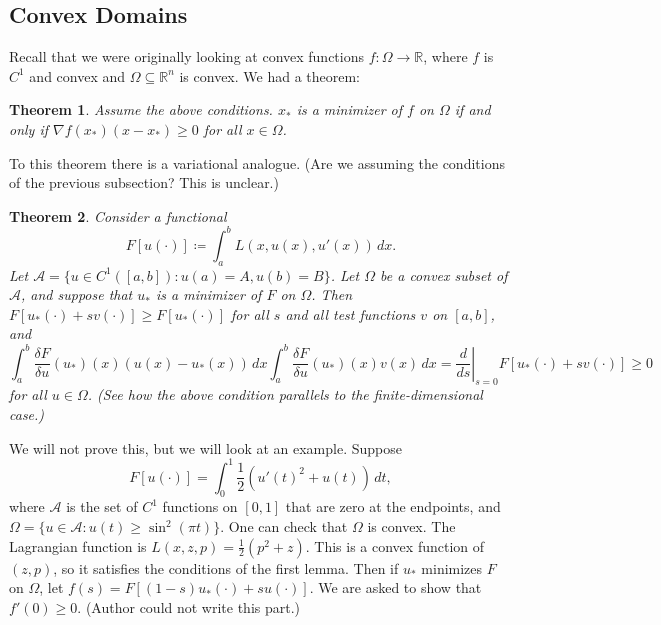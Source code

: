 \documentclass[11pt]{book}
\newcommand{\R}{\mathbb{R}}
\newtheorem{theorem}{Theorem}[subsection]
\begin{document}
\subsection{Convex Domains}

Recall that we were originally looking at convex functions $f : \Omega \to \R$, where $f$ is $C^1$ and convex and $\Omega \subseteq \R^n$ is convex. We had a theorem:
\begin{theorem}
Assume the above conditions. $x_*$ is a minimizer of $f$ on $\Omega$ if and only if $\nabla f(x_*)(x - x_*) \geq 0$ for all $x \in \Omega$.
\end{theorem}
To this theorem there is a variational analogue. (Are we assuming the conditions of the previous subsection? This is unclear.)
\begin{theorem}
Consider a functional
\[
F[u(\cdot)] \coloneqq \int_a^b L(x, u(x), u'(x)) \, dx.
\]
Let $\mathcal{A} = \{ u \in C^1([a, b]) : u(a) = A, u(b) = B \}$. Let $\Omega$ be a convex subset of $\mathcal{A}$, and suppose that $u_*$ is a minimizer of $F$ on $\Omega$. Then $F[u_*(\cdot) + sv(\cdot)] \geq F[u_*(\cdot)]$ for all $s$ and all test functions $v$ on $[a, b]$, and
\[
\int_a^b \frac{\delta F}{\delta u}(u_*)(x)(u(x) - u_*(x))\, dx \int_a^b \frac{\delta F}{\delta u}(u_*)(x)v(x)\,dx = \left. \frac{d}{ds} \right|_{s=0} F[u_*(\cdot) + sv(\cdot)] \geq 0
\]
for all $u \in \Omega$. (See how the above condition parallels to the finite-dimensional case.)
\end{theorem}

We will not prove this, but we will look at an example. Suppose
\[
F[u(\cdot)] = \int_0^1 \frac{1}{2} \left( u'(t)^2 + u(t) \right) \, dt,
\]
where $\mathcal{A}$ is the set of $C^1$ functions on $[0, 1]$ that are zero at the endpoints, and $\Omega = \{ u \in \mathcal{A} : u(t) \geq \sin^2(\pi t) \}$. One can check that $\Omega$ is convex. The Lagrangian function is $L(x,z,p) = \frac{1}{2}(p^2 + z)$. This is a convex function of $(z,p)$, so it satisfies the conditions of the first lemma. Then if $u_*$ minimizes $F$ on $\Omega$, let $f(s) = F[(1 - s)u_*(\cdot) + su(\cdot)]$. We are asked to show that $f'(0) \geq 0$. (Author could not write this part.)
\end{document}
